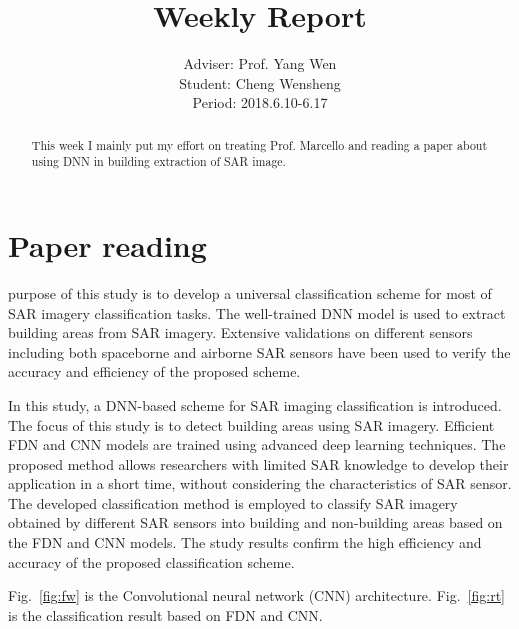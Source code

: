 \documentclass[]{IEEEtran}
\begin{document}
	\title{Weekly Report}
	\author{Adviser: Prof. Yang Wen \\Student: Cheng Wensheng\\ Period: 2018.6.10-6.17
	}
	\maketitle

\begin{abstract}
	This week I mainly put my effort on treating Prof. Marcello and reading a paper about using DNN in building extraction of SAR image. 
\end{abstract}

\section{Paper reading}
	 purpose of this study is to develop a universal classification scheme for most of SAR imagery classification tasks. The well-trained DNN model is used to extract building
	areas from SAR imagery. Extensive validations on different sensors including both
	spaceborne and airborne SAR sensors have been used to verify the accuracy and
	efficiency of the proposed scheme.


	In this study, a DNN-based scheme for SAR imaging classification is introduced. The
	focus of this study is to detect building areas using SAR imagery. Efficient FDN and CNN
	models are trained using advanced deep learning techniques. The proposed method
	allows researchers with limited SAR knowledge to develop their application in a short
	time, without considering the characteristics of SAR sensor. The developed classification
	method is employed to classify SAR imagery obtained by different SAR sensors into
	building and non-building areas based on the FDN and CNN models. The study results
	confirm the high efficiency and accuracy of the proposed classification scheme. 
	
	Fig.~\ref{fig:fw} is the Convolutional neural network (CNN) architecture. Fig.~\ref{fig:rt} is the classification result based on FDN and CNN.
	
\end{document}
